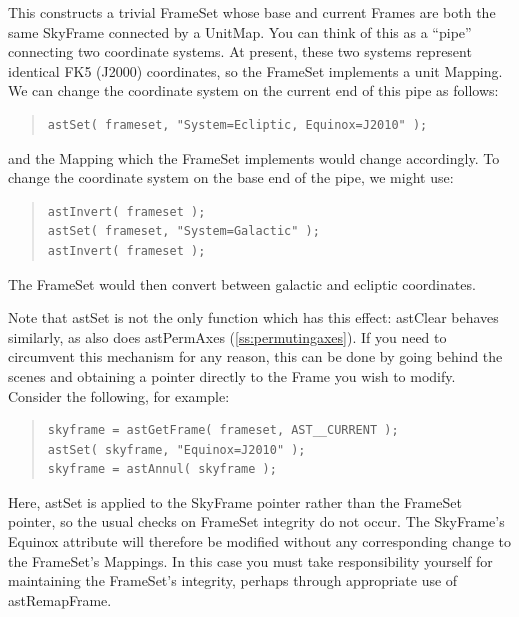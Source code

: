\documentclass[twoside,11pt]{article}
\newcommand{\htmlref}[2]{#1}
\newcommand{\secref}[1]{\S\ref{#1}}
\renewcommand{\secref}[1]{\ref{#1}}
\begin{document}
This constructs a trivial FrameSet whose base and current Frames are
both the same SkyFrame connected by a \htmlref{UnitMap}{UnitMap}. You can think of this
as a ``pipe'' connecting two coordinate systems. At present, these two
systems represent identical FK5 (J2000) coordinates, so the FrameSet
implements a unit Mapping. We can change the coordinate system on the
current end of this pipe as follows:

\begin{quote}
\small
\begin{verbatim}
astSet( frameset, "System=Ecliptic, Equinox=J2010" );
\end{verbatim}
\normalsize
\end{quote}

and the Mapping which the FrameSet implements would change
accordingly. To change the coordinate system on the base end of the
pipe, we might use:

\begin{quote}
\small
\begin{verbatim}
astInvert( frameset );
astSet( frameset, "System=Galactic" );
astInvert( frameset );
\end{verbatim}
\normalsize
\end{quote}

The FrameSet would then convert between galactic and ecliptic
coordinates.

Note that astSet is not the only function which has this effect:
\htmlref{astClear}{astClear} behaves similarly, as also does \htmlref{astPermAxes}{astPermAxes}
(\secref{ss:permutingaxes}). If you need to circumvent this mechanism
for any reason, this can be done by going behind the scenes and
obtaining a pointer directly to the Frame you wish to modify. Consider
the following, for example:

\begin{quote}
\small
\begin{verbatim}
skyframe = astGetFrame( frameset, AST__CURRENT );
astSet( skyframe, "Equinox=J2010" );
skyframe = astAnnul( skyframe );
\end{verbatim}
\normalsize
\end{quote}

Here, astSet is applied to the SkyFrame pointer rather than the
FrameSet pointer, so the usual checks on FrameSet integrity do not
occur. The SkyFrame's Equinox attribute will therefore be modified
without any corresponding change to the FrameSet's Mappings.  In this
case you must take responsibility yourself for maintaining the
FrameSet's integrity, perhaps through appropriate use of
astRemapFrame.
\end{document}
